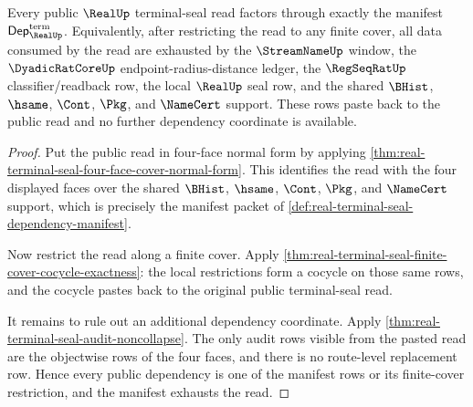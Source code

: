 \begin{theorem}
\label{thm:real-terminal-seal-dependency-manifest-exhaustion}
Every public $\RealUp$ terminal-seal read factors through exactly the manifest
$\mathsf{Dep}_{\RealUp}^{\mathrm{term}}$. Equivalently, after restricting the
read to any finite cover, all data consumed by the read are exhausted by the
$\StreamNameUp$ window, the $\DyadicRatCoreUp$ endpoint-radius-distance ledger,
the $\RegSeqRatUp$ classifier/readback row, the local $\RealUp$ seal row, and
the shared $\BHist$, $\hsame$, $\Cont$, $\Pkg$, and $\NameCert$ support. These
rows paste back to the public read and no further dependency coordinate is
available.
\end{theorem}
\begin{proof}
Put the public read in four-face normal form by applying
\autoref{thm:real-terminal-seal-four-face-cover-normal-form}. This identifies
the read with the four displayed faces over the shared $\BHist$, $\hsame$,
$\Cont$, $\Pkg$, and $\NameCert$ support, which is precisely the manifest
packet of \autoref{def:real-terminal-seal-dependency-manifest}.

Now restrict the read along a finite cover. Apply
\autoref{thm:real-terminal-seal-finite-cover-cocycle-exactness}: the local
restrictions form a cocycle on those same rows, and the cocycle pastes back to
the original public terminal-seal read.

It remains to rule out an additional dependency coordinate. Apply
\autoref{thm:real-terminal-seal-audit-noncollapse}. The only audit rows visible
from the pasted read are the objectwise rows of the four faces, and there is no
route-level replacement row. Hence every public dependency is one of the
manifest rows or its finite-cover restriction, and the manifest exhausts the
read.
\end{proof}

